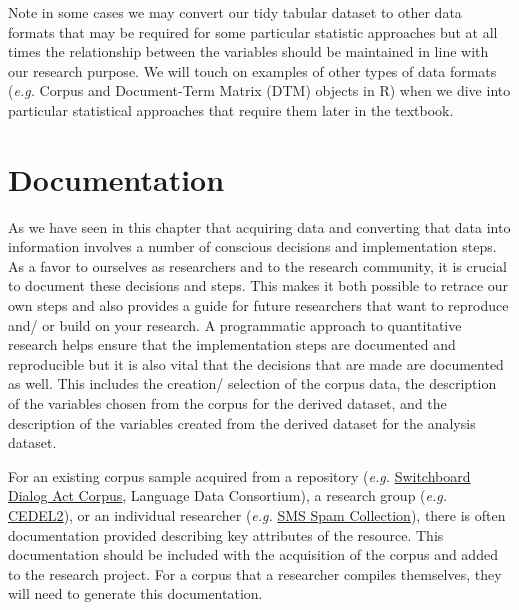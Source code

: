 \documentclass[
  letterpaper,
]{latex/krantz}
\begin{document}
\begin{tcolorbox}[enhanced jigsaw, opacitybacktitle=0.6, breakable, colframe=quarto-callout-warning-color-frame, arc=.35mm, left=2mm, leftrule=.75mm, title=\textcolor{quarto-callout-warning-color}{\faExclamationTriangle}\hspace{0.5em}{Tip}, opacityback=0, colback=white, toptitle=1mm, rightrule=.15mm, titlerule=0mm, bottomtitle=1mm, bottomrule=.15mm, coltitle=black, colbacktitle=quarto-callout-warning-color!10!white, toprule=.15mm]
Note in some cases we may convert our tidy tabular dataset to other data
formats that may be required for some particular statistic approaches
but at all times the relationship between the variables should be
maintained in line with our research purpose. We will touch on examples
of other types of data formats (\emph{e.g.} Corpus and Document-Term
Matrix (DTM) objects in R) when we dive into particular statistical
approaches that require them later in the textbook.
\end{tcolorbox}

\hypertarget{documentation}{%
\section{Documentation}\label{documentation}}

As we have seen in this chapter that acquiring data and converting that
data into information involves a number of conscious decisions and
implementation steps. As a favor to ourselves as researchers and to the
research community, it is crucial to document these decisions and steps.
This makes it both possible to retrace our own steps and also provides a
guide for future researchers that want to reproduce and/ or build on
your research. A programmatic approach to quantitative research helps
ensure that the implementation steps are documented and reproducible but
it is also vital that the decisions that are made are documented as
well. This includes the creation/ selection of the corpus data, the
description of the variables chosen from the corpus for the derived
dataset, and the description of the variables created from the derived
dataset for the analysis dataset.

For an existing corpus sample acquired from a repository (\emph{e.g.}
\href{https://catalog.ldc.upenn.edu/LDC97S62}{Switchboard Dialog Act
Corpus}, Language Data Consortium), a research group (\emph{e.g.}
\href{http://cedel2.learnercorpora.com/}{CEDEL2}), or an individual
researcher (\emph{e.g.}
\href{https://www.dt.fee.unicamp.br/~tiago/smsspamcollection/}{SMS Spam
Collection}), there is often documentation provided describing key
attributes of the resource. This documentation should be included with
the acquisition of the corpus and added to the research project. For a
corpus that a researcher compiles themselves, they will need to generate
this documentation.
\end{document}
